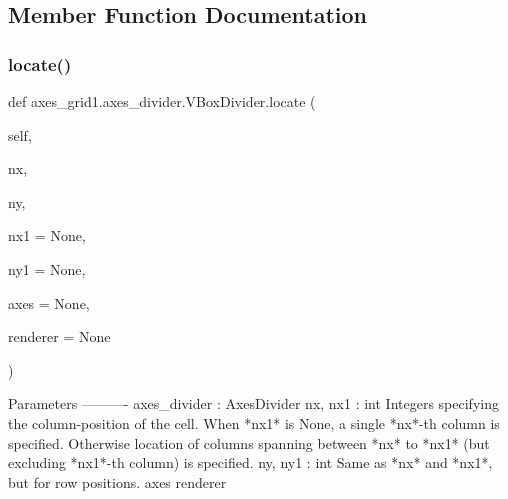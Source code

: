 \subsection{Member Function Documentation}
\mbox{\label{classaxes__grid1_1_1axes__divider_1_1VBoxDivider_ae4db7b2c903e7be30d24d6e2c729dea2}} 
\subsubsection{\texorpdfstring{locate()}{locate()}}
{\footnotesize\ttfamily def axes\+\_\+grid1.\+axes\+\_\+divider.\+V\+Box\+Divider.\+locate (\begin{DoxyParamCaption}\item[{}]{self,  }\item[{}]{nx,  }\item[{}]{ny,  }\item[{}]{nx1 = {\ttfamily None},  }\item[{}]{ny1 = {\ttfamily None},  }\item[{}]{axes = {\ttfamily None},  }\item[{}]{renderer = {\ttfamily None} }\end{DoxyParamCaption})}

\begin{DoxyVerb}Parameters
----------
axes_divider : AxesDivider
nx, nx1 : int
    Integers specifying the column-position of the
    cell. When *nx1* is None, a single *nx*-th column is
    specified. Otherwise location of columns spanning between *nx*
    to *nx1* (but excluding *nx1*-th column) is specified.
ny, ny1 : int
    Same as *nx* and *nx1*, but for row positions.
axes
renderer
\end{DoxyVerb}
 \mbox{\label{classaxes__grid1_1_1axes__divider_1_1VBoxDivider_a0c5b79d180078a44c42c6446531e61a7}} 
